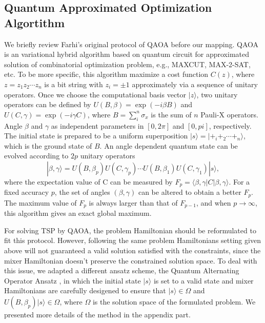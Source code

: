 \documentclass[aps,pra,twocolumn,superscriptaddress]{revtex4-2}
\begin{document}
\subsection{Quantum Approximated Optimization Algortithm}
We briefly review Farhi's original protocol of QAOA before our mapping. QAOA is an variational hybrid algorithm based on quantum circuit for approximated solution of combinatorial optimization problem, e.g., MAXCUT, MAX-2-SAT, etc. To be more specific, this algorithm maximize a cost function $C(z)$, where $z=z_1z_2\cdots z_n$ is a bit string with $z_i=\pm1$ approximately via a sequence of unitary operators. Once we choose the computational basis vector $|z\rangle$, two unitary operators can be defined by $U(B,\beta)=\exp(-i\beta B)$ and  $U(C,\gamma)=\exp(-i\gamma C)$, where $B=\sum_i^n \sigma_x$ is the sum of $n$ Pauli-X operators. Angle $\beta$ and $\gamma$ as independent parameters in $[0,2\pi]$ and $[0,pi]$, respectively. The initial state is prepared to be a uniform superposition $|s\rangle=|+_i+_2\cdots+_n\rangle$, which is the ground state of $B$. An angle dependent quantum state can be evolved according to $2p$ unitary operators
\begin{equation}
|\beta,\gamma\rangle=U(B,\beta_p)U(C,\gamma_p)\cdots U(B,\beta_1)U(C,\gamma_1)|s\rangle,
\end{equation}
where the expectation value of C can be measured by $F_p=\langle\beta,\gamma|C|\beta,\gamma\rangle$. For a fixed accuracy $p$, the set of angles $(\beta,\gamma)$ can be altered to obtain a better $F_p$. The maximum value of $F_p$ is always larger than that of $F_{p-1}$, and when $p\rightarrow\infty$, this algorithm gives an exact global maximum.

For solving TSP by QAOA, the problem Hamiltonian should be reformulated to fit this protocol. However, following the same problem Hamiltonians setting given above will not guaranteed a valid solution satisfied with the constraints, since the mixer Hamiltonian doesn't preserve the constrained solution space. To deal with this issue, we adapted a different ansatz scheme, the Quantum Alternating Operator Ansatz \cite{}, in which the initial state $|s\rangle$ is set to a valid state and mixer Hamiltonians are carefully desigened to ensure that 
$|s\rangle \in \Omega$ and $U(B,\beta_p)|s\rangle \in \Omega$, where $\Omega$ is the solution space of the formulated problem. We presented more details of the method in the appendix part.
\end{document}
